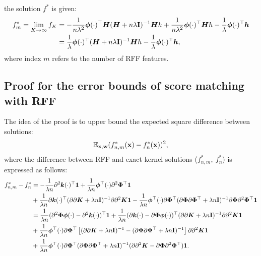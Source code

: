 the solution $f^*$ is given:
\begin{align*}
    f_{m}^* = \lim\limits_{K \to \infty} f_K
    &= -\frac{1}{n\lambda^2}{\bm\phi}(\cdot)^{\top}{\bm H}({\bm H} +
    n \lambda {\bf I})^{-1}{\bm Hh} + \frac{1}{n\lambda^2}{\bm \phi}(\cdot)^{\top}{\bm Hh} -
    \frac{1}{\lambda}{\bm \phi}(\cdot)^{\top}{\bm h}\nonumber\\
    &= \frac{1}{\lambda}{\bm \phi}(\cdot)^{\top}({\bm H} + n\lambda{\bf I})^{-1}{\bm Hh}
    - \frac{1}{\lambda}{\bm \phi}(\cdot)^{\top}{\bm h},
\end{align*}
where index $m$ refers to the number of RFF features.




\subsection{Proof for the error bounds of score matching with RFF}
\label{sec:error_bound_proof}
The idea of the proof is to upper bound the expected square difference between solutions:
\begin{equation}
    \mathbb{E}_{{\bf x}, {\bf w}}(f_{n, m}^*({\bf x}) - f_n^*({\bf x}))^2,
\end{equation}
where the difference between RFF and exact kernel solutions ($f_{n, m}^*,~f_n^*$)
is expressed as follows:
\begin{align*}
    f_{n, m}^* - f_n^*
    &= -\frac{1}{\lambda n}\partial^2{\bm k}(\cdot)^{\top}{\bf 1}
    + \frac{1}{\lambda n} {\bm \phi}^{\top}(\cdot)\partial^2\bm{\Phi}^{\top}{\bf 1} \\
    &+ \frac{1}{\lambda n}\partial{\bm k}(\cdot)^{\top}(\partial\partial {\bm K} +
    \lambda n{\bf I})^{-1}\partial\partial^2 {\bm K}{\bf 1}
    -\frac{1}{\lambda n}{\bm \phi}^{\top}(\cdot)\partial\bm{\Phi}^{\top}(\partial\bm{\Phi}
    \partial\bm{\Phi}^{\top} +
    \lambda n {\bf I})^{-1}\partial\bm{\Phi}\partial^2\bm{\Phi}^{\top}{\bf 1} \\
    &= \frac{1}{\lambda n}(\partial^2\bm{\Phi}{\bm \phi}(\cdot) -
    \partial^2{\bm k}(\cdot))^{\top}{\bf 1}
    + \frac{1}{\lambda n}(\partial{\bm k}(\cdot) -
    \partial\bm{\Phi}{\bm \phi}(\cdot))^{\top}(\partial\partial {\bm K} +
    \lambda n{\bf I})^{-1}\partial\partial^2 {\bm K}{\bf 1} \\
    &+ \frac{1}{\lambda n}{\bm \phi}^{\top}(\cdot)\partial\bm{\Phi}^{\top} \left[
        (\partial\partial {\bm K} + \lambda n{\bf I})^{-1} -
        (\partial\bm{\Phi}\partial\bm{\Phi}^{\top} + \lambda n {\bf I})^{-1}
    \right] \partial\partial^2 {\bm K}{\bf 1} \\
    &+ \frac{1}{\lambda n}{\bm \phi}^{\top}(\cdot)\partial\bm{\Phi}^{\top}(\partial\bm{\Phi}
    \partial\bm{\Phi}^{\top} + \lambda n {\bf I})^{-1}(\partial\partial^2 {\bm K} -
    \partial\bm{\Phi}\partial^2\bm{\Phi}^{\top}){\bf 1}.
\end{align*}
